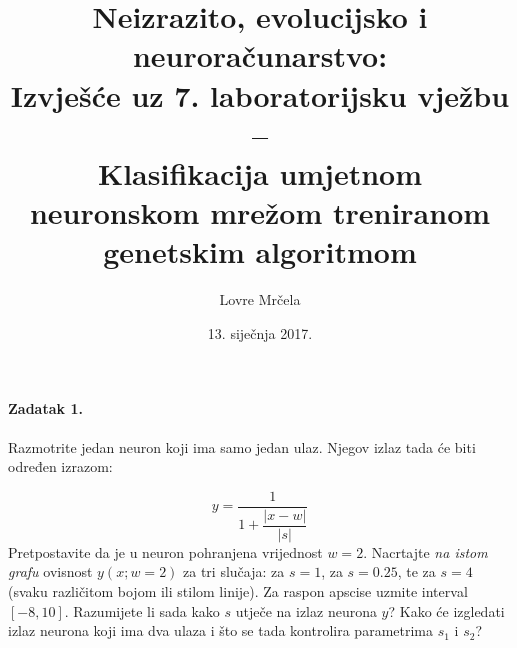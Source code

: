 \documentclass[12pt, a4paper]{article}
\title{Neizrazito, evolucijsko i neuroračunarstvo:\\
  Izvješće uz 7. laboratorijsku vježbu -- \\Klasifikacija umjetnom neuronskom mrežom treniranom genetskim algoritmom}
\author{Lovre Mrčela}
\date{13. siječnja 2017.}
\begin{document}
\maketitle

\paragraph{Zadatak 1.}
Razmotrite jedan neuron koji ima samo jedan ulaz.
Njegov izlaz tada će biti određen izrazom:

$$ y= \dfrac{1}{1 + \dfrac{|x - w|}{|s|}}$$
Pretpostavite da je u neuron pohranjena vrijednost $w=2$. Nacrtajte \textit{na istom grafu} ovisnost $y(x; w=2)$ za tri slučaja: za $s=1$, za $s=0.25$, te za $s=4$ (svaku različitom bojom ili stilom linije). Za raspon apscise uzmite interval $[-8, 10]$. Razumijete li sada kako $s$ utječe na izlaz neurona $y$? Kako će izgledati izlaz neurona koji ima dva ulaza i što se tada kontrolira parametrima $s_1$ i $s_2$?
\end{document}
